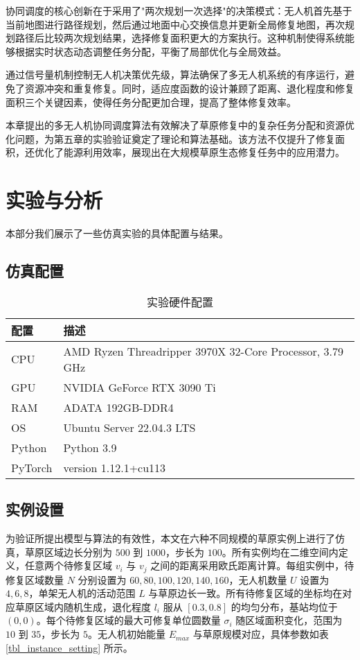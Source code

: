 \documentclass[AutoFakeBold]{LZUThesis}
\begin{document}
协同调度的核心创新在于采用了"两次规划一次选择"的决策模式：无人机首先基于当前地图进行路径规划，然后通过地面中心交换信息并更新全局修复地图，再次规划路径后比较两次规划结果，选择修复面积更大的方案执行。这种机制使得系统能够根据实时状态动态调整任务分配，平衡了局部优化与全局效益。

通过信号量机制控制无人机决策优先级，算法确保了多无人机系统的有序运行，避免了资源冲突和重复修复。同时，适应度函数的设计兼顾了距离、退化程度和修复面积三个关键因素，使得任务分配更加合理，提高了整体修复效率。

本章提出的多无人机协同调度算法有效解决了草原修复中的复杂任务分配和资源优化问题，为第五章的实验验证奠定了理论和算法基础。该方法不仅提升了修复面积，还优化了能源利用效率，展现出在大规模草原生态修复任务中的应用潜力。

\chapter{实验与分析}
本部分我们展示了一些仿真实验的具体配置与结果。
\label{sub:实验配置表格}
\section{仿真配置}
\begin{table}[H]
	\centering
	\caption{实验硬件配置}
	\begin{tabular}{ll} %
		\toprule
		配置      & 描述                                                       \\
		\midrule
		CPU     & AMD Ryzen Threadripper 3970X 32-Core Processor, 3.79 GHz \\
		GPU     & NVIDIA GeForce RTX 3090 Ti                               \\
		RAM     & ADATA 192GB-DDR4                                         \\
		OS      & Ubuntu Server 22.04.3 LTS                                \\
		Python  & Python 3.9                                               \\
		PyTorch & version 1.12.1+cu113                                     \\
		\bottomrule
	\end{tabular}
	\label{tbl_hardware_config}
\end{table}
\section{实例设置}
为验证所提出模型与算法的有效性，本文在六种不同规模的草原实例上进行了仿真，草原区域边长分别为 $500$ 到 $1000$，步长为 $100$。所有实例均在二维空间内定义，任意两个待修复区域 $v_i$ 与 $v_j$ 之间的距离采用欧氏距离计算。每组实例中，待修复区域数量 $N$ 分别设置为 $60, 80, 100, 120, 140, 160$，无人机数量 $U$ 设置为 $4, 6, 8$，单架无人机的活动范围 $L$ 与草原边长一致。所有待修复区域的坐标均在对应草原区域内随机生成，退化程度 $l_i$ 服从 $[0.3, 0.8]$ 的均匀分布，基站均位于 $(0,0)$。每个待修复区域的最大可修复单位圆数量 $\sigma_i$ 随区域面积变化，范围为 $10$ 到 $35$，步长为 $5$。无人机初始能量 $E_{max}$ 与草原规模对应，具体参数如表\ref{tbl_instance_setting} 所示。
\end{document}
